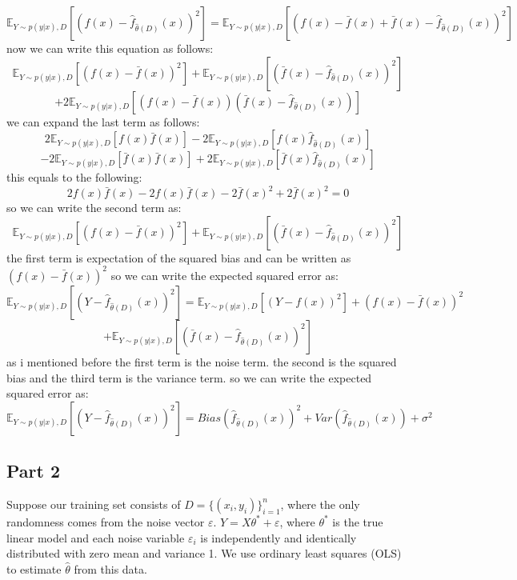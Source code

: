 \begin{qsolve}
\begin{qsolve}[]
		$$
		\mathbb{E}_{Y \sim p(y|x),D} \left[ (f(x) - \hat{f}_{\hat{\theta}(D)}(x))^2 \right] = \mathbb{E}_{Y \sim p(y|x),D} \left[ (f(x) - \bar{f}(x) + \bar{f}(x) - \hat{f}_{\hat{\theta}(D)}(x))^2 \right]
		$$
		now we can write this equation as follows:
		$$
		\mathbb{E}_{Y \sim p(y|x),D} \left[ (f(x) - \bar{f}(x))^2 \right] + \mathbb{E}_{Y \sim p(y|x),D} \left[ (\bar{f}(x) - \hat{f}_{\hat{\theta}(D)}(x))^2 \right]
		$$
		$$
		+ 2\mathbb{E}_{Y \sim p(y|x),D} \left[ (f(x) - \bar{f}(x))(\bar{f}(x) - \hat{f}_{\hat{\theta}(D)}(x)) \right]
		$$
		we can expand the last term as follows:
		$$
		2\mathbb{E}_{Y \sim p(y|x),D} \left[ f(x)\bar{f}(x) \right] - 2\mathbb{E}_{Y \sim p(y|x),D} \left[ f(x)\hat{f}_{\hat{\theta}(D)}(x) \right]
		$$
		$$
		-2\mathbb{E}_{Y \sim p(y|x),D} \left[ \bar{f}(x)\bar{f}(x) \right] + 2\mathbb{E}_{Y \sim p(y|x),D} \left[ \bar{f}(x)\hat{f}_{\hat{\theta}(D)}(x) \right]
		$$
		this equals to the following:
		$$
		2f(x)\bar{f}(x) - 2f(x)\bar{f}(x) - 2\bar{f}(x)^2 + 2\bar{f}(x)^2 = 0
		$$
		so we can write the second term as:
		$$
		\mathbb{E}_{Y \sim p(y|x),D} \left[ (f(x) - \bar{f}(x))^2 \right] + \mathbb{E}_{Y \sim p(y|x),D} \left[ (\bar{f}(x) - \hat{f}_{\hat{\theta}(D)}(x))^2 \right]
		$$
		the first term is expectation of the squared bias and can be written as $(f(x) - \bar{f}(x))^2$  
		so we can write the expected squared error as:
		$$
		\mathbb{E}_{Y \sim p(y|x),D} \left[ (Y - \hat{f}_{\hat{\theta}(D)}(x))^2 \right] = \mathbb{E}_{Y \sim p(y|x),D} \left[ (Y - f(x))^2 \right]+  (f(x) - \bar{f}(x))^2 $$
		$$
		+\mathbb{E}_{Y \sim p(y|x),D} \left[ (\bar{f}(x) - \hat{f}_{\hat{\theta}(D)}(x))^2 \right]
		$$
		as i mentioned before the first term is the noise term. the second is the squared bias and the third term is the variance term. so we can write the expected squared error as:
		$$
		\mathbb{E}_{Y \sim p(y|x),D} \left[ (Y - \hat{f}_{\hat{\theta}(D)}(x))^2 \right] = Bias \left( \hat{f}_{\hat{\theta}(D)}(x) \right)^2 + Var \left( \hat{f}_{\hat{\theta}(D)}(x) \right) + \sigma^2
		$$

	\end{qsolve}
\end{qsolve}
\subsection{Part 2}
Suppose our training set consists of \( D = \{(x_i, y_i)\}_{i=1}^{n} \), where the only randomness comes from the noise vector \( \varepsilon \). \( Y = X\theta^* + \varepsilon \), where \( \theta^* \) is the true linear model and each noise variable \( \varepsilon_i \) is independently and identically distributed with zero mean and variance 1. We use ordinary least squares (OLS) to estimate \( \hat{\theta} \) from this data.

